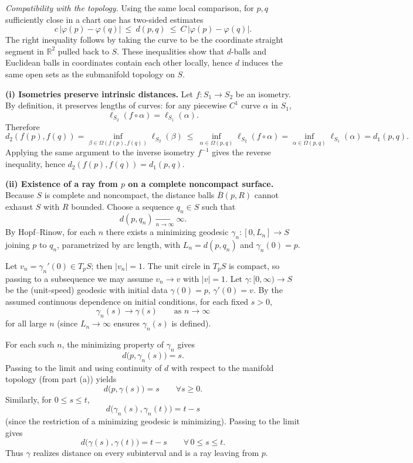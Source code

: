 \documentclass[12pt,a4paper]{article}
\theoremstyle{plain}
\theoremstyle{definition}      %
\begin{document}
	\emph{Compatibility with the topology.}
	Using the same local comparison, for $p,q$ sufficiently close in a chart one has two-sided estimates
	\[
	c\,|\varphi(p)-\varphi(q)| \ \le\ d(p,q) \ \le\ C\,|\varphi(p)-\varphi(q)|.
	\]
	The right inequality follows by taking the curve to be the coordinate straight segment in $\mathbb R^2$ pulled back to $S$.
	These inequalities show that $d$-balls and Euclidean balls in coordinates contain each other locally, hence $d$ induces the same
	open sets as the submanifold topology on $S$.
	
	\smallskip
	\textbf{(i) Isometries preserve intrinsic distances.}
	Let $f:S_1\to S_2$ be an isometry. By definition, it preserves lengths of curves:
	for any piecewise $C^1$ curve $\alpha$ in $S_1$,
	\[
	\ell_{S_2}(f\circ \alpha)=\ell_{S_1}(\alpha).
	\]
	Therefore
	\[
	d_2(f(p),f(q))
	=
	\inf_{\beta\in\Omega(f(p),f(q))}\ell_{S_2}(\beta)
	\ \le\
	\inf_{\alpha\in\Omega(p,q)} \ell_{S_2}(f\circ\alpha)
	=
	\inf_{\alpha\in\Omega(p,q)} \ell_{S_1}(\alpha)
	=
	d_1(p,q).
	\]
	Applying the same argument to the inverse isometry $f^{-1}$ gives the reverse inequality, hence
	$d_2(f(p),f(q))=d_1(p,q)$.
	
	\smallskip
	\textbf{(ii) Existence of a ray from $p$ on a complete noncompact surface.}
	Because $S$ is complete and noncompact, the distance balls $\overline B(p,R)$ cannot exhaust $S$ with $R$ bounded.
	Choose a sequence $q_n\in S$ such that
	\[
	d(p,q_n)\xrightarrow[n\to\infty]{}\infty.
	\]
	By Hopf--Rinow, for each $n$ there exists a minimizing geodesic $\gamma_n:[0,L_n]\to S$ joining $p$ to $q_n$, parametrized by arc length,
	with $L_n=d(p,q_n)$ and $\gamma_n(0)=p$.
	
	Let $v_n=\gamma_n'(0)\in T_pS$; then $|v_n|=1$. The unit circle in $T_pS$ is compact, so passing to a subsequence we may assume
	$v_n\to v$ with $|v|=1$.
	Let $\gamma:[0,\infty)\to S$ be the (unit-speed) geodesic with initial data $\gamma(0)=p$, $\gamma'(0)=v$.
	By the assumed continuous dependence on initial conditions, for each fixed $s>0$,
	\[
	\gamma_n(s)\to \gamma(s)\qquad\text{as }n\to\infty
	\]
	for all large $n$ (since $L_n\to\infty$ ensures $\gamma_n(s)$ is defined).
	
	For each such $n$, the minimizing property of $\gamma_n$ gives
	\[
	d\bigl(p,\gamma_n(s)\bigr)=s.
	\]
	Passing to the limit and using continuity of $d$ with respect to the manifold topology (from part (a)) yields
	\[
	d\bigl(p,\gamma(s)\bigr)=s\qquad\forall s\ge 0.
	\]
	Similarly, for $0\le s\le t$,
	\[
	d\bigl(\gamma_n(s),\gamma_n(t)\bigr)=t-s
	\]
	(since the restriction of a minimizing geodesic is minimizing). Passing to the limit gives
	\[
	d\bigl(\gamma(s),\gamma(t)\bigr)=t-s\qquad\forall\,0\le s\le t.
	\]
	Thus $\gamma$ realizes distance on every subinterval and is a ray leaving from $p$.
	
\end{document}
